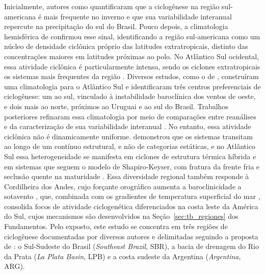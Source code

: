 Inicialmente, autores como \citet{gan1991surface} quantificaram que a ciclogênese na região sul-americana é mais frequente no inverno e que sua variabilidade interanual repercute na precipitação do sul do Brasil.
Pouco depois, a climatologia hemisférica de \citet{jones1993climatology} confirmou esse sinal, identificando a região sul-americana como um núcleo de densidade ciclônica próprio das latitudes extratropicais, distinto das concentrações maiores em latitudes próximas ao polo.
No Atlântico Sul ocidental, essa atividade ciclônica é particularmente intensa, sendo os ciclones extratropicais os sistemas mais frequentes da região \citep{reboita2026meteorology}.
Diversos estudos, como o de \citet{reboita2010south}, construíram uma climatologia para o Atlântico Sul e identificaram três centros preferenciais de ciclogênese: um ao sul, vinculado à instabilidade baroclínica dos ventos de oeste, e dois mais ao norte, próximos ao Uruguai e ao sul do Brasil.
Trabalhos posteriores refinaram essa climatologia por meio de comparações entre reanálises \citep{gramcianinov2020analysis} e da caracterização de sua variabilidade interanual \citep{padilhareinke2026characterization}.
No entanto, essa atividade ciclônica não é dinamicamente uniforme. \citet{hart2003cyclone} demonstrou que os sistemas transitam ao longo de um contínuo estrutural, e não de categorias estáticas, e no Atlântico Sul essa heterogeneidade se manifesta em ciclones de estrutura térmica híbrida \citep{evans2012climatology} e em sistemas que seguem o modelo de Shapiro-Keyser, com fratura da frente fria e seclusão quente na maturidade \citep{gozzo2013air}.
Essa diversidade regional também responde à Cordilheira dos Andes, cujo forçante orográfico aumenta a baroclinicidade a sotavento \citep{gan1994influence}, que, combinada com os gradientes de temperatura superficial do mar \citep{reboita2026meteorology}, consolida focos de atividade ciclogenética diferenciados na costa leste da América do Sul, cujos mecanismos são desenvolvidos na Seção~\ref{sec:tb_regiones} dos Fundamentos.
\label{sec:definicion_regiones}%
Pelo exposto, este estudo se concentra em três regiões de ciclogênese documentadas por diversos autores \citep{crespo2020potential, gramcianinov2019properties, reboita2026meteorology} e delimitadas seguindo a proposta de \citet{gramcianinov2019properties}: o Sul-Sudeste do Brasil (\textit{Southeast Brazil}, SBR), a bacia de drenagem do Rio da Prata (\textit{La Plata Basin}, LPB) e a costa sudeste da Argentina (\textit{Argentina}, ARG).

